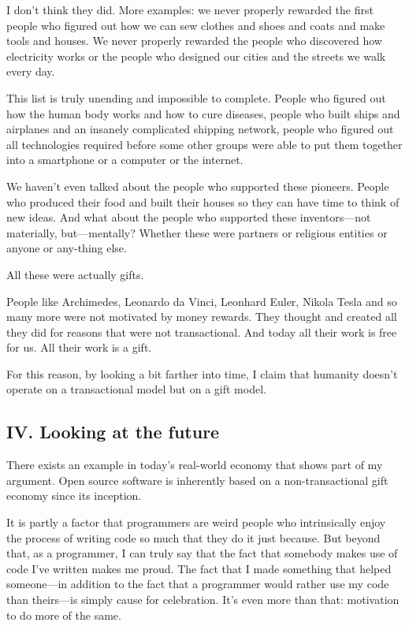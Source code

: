 I don’t think they did. More examples: we never properly rewarded the first people who figured out how we can sew clothes and shoes and coats and make tools and houses. We never properly rewarded the people who discovered how electricity works or the people who designed our cities and the streets we walk every day.

This list is truly unending and impossible to complete. People who figured out how the human body works and how to cure diseases, people who built ships and airplanes and an insanely complicated shipping network, people who figured out all technologies required before some other groups were able to put them together into a smartphone or a computer or the internet.

We haven’t even talked about the people who supported these pioneers. People who produced their food and built their houses so they can have time to think of new ideas. And what about the people who supported these inventors—not materially, but—mentally? Whether these were partners or religious entities or anyone or any-thing else.

All these were actually gifts.

People like Archimedes, Leonardo da Vinci, Leonhard Euler, Nikola Tesla and so many more were not motivated by money rewards. They thought and created all they did for reasons that were not transactional. And today all their work is free for us. All their work is a gift.

For this reason, by looking a bit farther into time, I claim that humanity doesn’t operate on a transactional model but on a gift model.

\subsection{IV. Looking at the future}

There exists an example in today’s real-world economy that shows part of my argument. Open source software is inherently based on a non-transactional gift economy since its inception.

It is partly a factor that programmers are weird people who intrinsically enjoy the process of writing code so much that they do it just because. But beyond that, as a programmer, I can truly say that the fact that somebody makes use of code I’ve written makes me proud. The fact that I made something that helped someone—in addition to the fact that a programmer would rather use my code than theirs—is simply cause for celebration. It’s even more than that: motivation to do more of the same.

